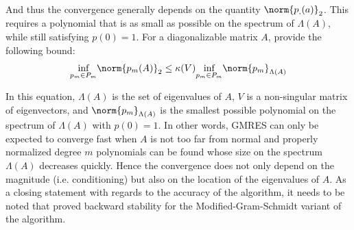 \noindent And thus the convergence generally depends on the quantity $\norm{p_,(a)}_2$. This requires a polynomial that is as small as possible on the spectrum of $\Lambda(A)$, while still satisfying $p(0)=1$. For a diagonalizable matrix $A$, \cite{trefethen_numerical_1997} provide the following bound:
\begin{equation}
    \underset{p_m \in P_m}{\text{inf}} \norm{p_m(A)}_2 \leq \kappa(V) \underset{p_m \in P_m}{\text{inf}} \norm{p_m}_{\Lambda(A)}
\end{equation}

\noindent In this equation, $\Lambda(A)$ is the set of eigenvalues of $A$, $V$ is a non-singular matrix of eigenvectors, and $\norm{p_m}_{\Lambda(A)}$ is the smallest possible polynomial on the spectrum of $\Lambda(A)$ with $p(0)=1$. In other words, GMRES can only be expected to converge fast when $A$ is not too far from normal and properly normalized degree $m$ polynomials can be found whose size on the spectrum $\Lambda(A)$ decreases quickly. Hence the convergence does not only depend on the magnitude (i.e. conditioning) but also on the location of the eigenvalues of $A$.
As a closing statement with regards to the accuracy of the algorithm, it needs to be noted that \cite{paige_modified_2006} proved backward stability for the Modified-Gram-Schmidt variant of the algorithm. 